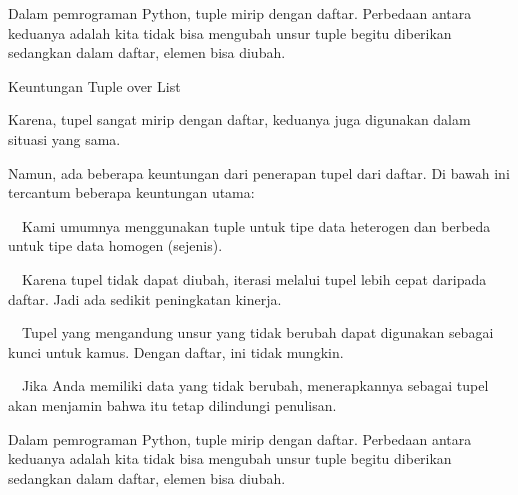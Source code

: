 \documentclass[a4paper,12pt]{report}
\begin{document}
\vspace{14pt}
\vspace{14pt}
\vspace{14pt}
\vspace{14pt}
\vspace{14pt}
\noindent 
{\fontsize{14pt}{14pt}\selectfont Dalam pemrograman Python, tuple mirip dengan daftar. Perbedaan antara keduanya adalah kita tidak bisa mengubah unsur tuple begitu diberikan sedangkan dalam daftar, elemen bisa diubah. \\} \par
\noindent 
{\fontsize{14pt}{14pt}\selectfont Keuntungan Tuple over List \\} \par
\vspace{14pt}
\noindent 
{\fontsize{14pt}{14pt}\selectfont Karena, tupel sangat mirip dengan daftar, keduanya juga digunakan dalam situasi yang sama. \\} \par
\vspace{14pt}
\noindent 
{\fontsize{14pt}{14pt}\selectfont Namun, ada beberapa keuntungan dari penerapan tupel dari daftar. Di bawah ini tercantum beberapa keuntungan utama: \\} \par
\vspace{14pt}
\noindent 
{\fontsize{14pt}{14pt}\selectfont  $  $ $  $ $  $ $  $Kami umumnya menggunakan tuple untuk tipe data heterogen dan berbeda untuk tipe data homogen (sejenis). \\} \par
\noindent 
{\fontsize{14pt}{14pt}\selectfont  $  $ $  $ $  $ $  $Karena tupel tidak dapat diubah, iterasi melalui tupel lebih cepat daripada daftar. Jadi ada sedikit peningkatan kinerja. \\} \par
\noindent 
{\fontsize{14pt}{14pt}\selectfont  $  $ $  $ $  $ $  $Tupel yang mengandung unsur yang tidak berubah dapat digunakan sebagai kunci untuk kamus. Dengan daftar, ini tidak mungkin. \\} \par
\noindent 
{\fontsize{14pt}{14pt}\selectfont  $  $ $  $ $  $ $  $Jika Anda memiliki data yang tidak berubah, menerapkannya sebagai tupel akan menjamin bahwa itu tetap dilindungi penulisan. \\} \par
\vspace{20pt}
\noindent 
{\fontsize{14pt}{14pt}\selectfont Dalam pemrograman Python, tuple mirip dengan daftar. Perbedaan antara keduanya adalah kita tidak bisa mengubah unsur tuple begitu diberikan sedangkan dalam daftar, elemen bisa diubah. \\} \par
\end{document}
